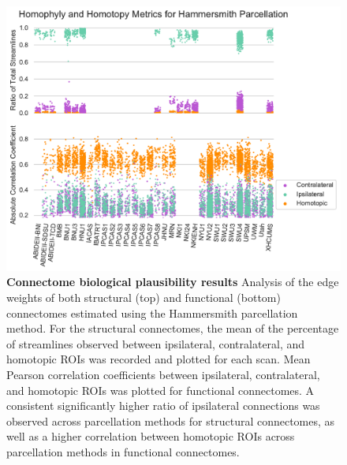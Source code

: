 \begin{figure}[h!]
    \centering
    \includegraphics[width=1\textwidth]{figures/m2g/ipsi_hammer.pdf}
    \caption[Analysis of the edge weights of both structural (top) and functional (bottom) connectomes estimated using the Hammersmith parcellation method.]{\textbf{Connectome biological plausibility results} Analysis of the edge weights of both structural (top) and functional (bottom) connectomes estimated using the Hammersmith parcellation method. For the structural connectomes, the mean of the percentage of streamlines observed between ipsilateral, contralateral, and homotopic ROIs was recorded and plotted for each scan. Mean Pearson correlation coefficients between ipsilateral, contralateral, and homotopic ROIs was plotted for functional connectomes. A consistent significantly higher ratio of ipsilateral connections was observed across parcellation methods for structural connectomes, as well as a higher correlation between homotopic ROIs across parcellation methods in functional connectomes.}
    \label{fig:ipsi_hammer}
\end{figure}


